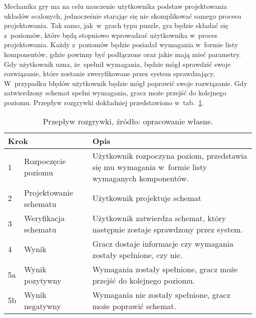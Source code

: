 Mechanika gry ma na celu nauczenie użytkownika podstaw projektowania układów scalonych,
jednocześnie starając się nie skomplikować samego procesu projektowania.
Tak samo, jak~w~grach typu puzzle, gra będzie składać się z~poziomów,
które będą stopniowo wprowadzać użytkownika w~proces projektowania.
Każdy z~poziomów będzie posiadał wymagania w~formie listy komponentów,
gdzie powinny być podłączone oraz jakie mają mieć parametry.
Gdy użytkownik uzna, że~spełnił wymagania, będzie mógł sprawdzić swoje rozwiązanie,
które zostanie zweryfikowane przez system sprawdzający.
W~przypadku błędów %
użytkownik będzie mógł poprawić swoje rozwiązanie. %
Gdy zatwierdzony schemat spełni wymagania, gracz może przejść do kolejnego poziomu.
Przepływ rozgrywki dokładniej przedstawiono w~tab.~\ref{tab:game_flow}.

\begin{table}[h]
    \centering
    \caption[Przepływ rozgrywki.]
    {Przepływ rozgrywki, źródło: opracowanie własne.}
    \label{tab:game_flow}
    \begin{tabular}{|l p{}|p{}|}
        \hline
        \multicolumn{2}{|l|}{Krok} & Opis \\
        \hline
        \hline
        1 & Rozpoczęcie poziomu &
        Użytkownik rozpoczyna poziom, przedstawia się mu wymagania w~formie listy wymaganych komponentów. \\
        \hline
        2 & Projektowanie schematu &
        Użytkownik projektuje schemat\\ %
        \hline
        3 & Weryfikacja schematu &
        Użytkownik zatwierdza schemat, który następnie zostaje sprawdzony przez system. \\
        \hline
        4 & Wynik &
        Gracz dostaje informacje czy wymagania zostały spełnione, czy nie. \\
        \hline
        5a & Wynik pozytywny &
        Wymagania zostały spełnione, gracz może przejść do kolejnego poziomu. \\
        \hline
        5b & Wynik negatywny &
        Wymagania nie zostały spełnione, gracz może poprawić schemat. \\
        \hline
    \end{tabular}
\end{table}

